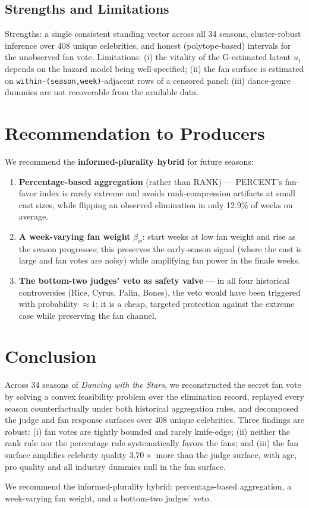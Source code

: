 \documentclass[11pt]{article}
\begin{document}
\subsection{Strengths and Limitations}

Strengths: a single consistent standing vector across all 34 seasons, cluster-robust inference
over 408 unique celebrities, and honest (polytope-based) intervals for the unobserved fan vote.
Limitations: (i) the vitality of the G-estimated latent $u_i$ depends on the hazard model being
well-specified; (ii) the fan surface is estimated on \texttt{within-(season,week)}-adjacent rows
of a censored panel; (iii) dance-genre dummies are not recoverable from the available data.

\section{Recommendation to Producers}
\label{sec:reco}

We recommend the \textbf{informed-plurality hybrid} for future seasons:
\begin{enumerate}
\item \textbf{Percentage-based aggregation} (rather than RANK) --- PERCENT's fan-favor index is
rarely extreme and avoids rank-compression artifacts at small cast sizes, while flipping an
observed elimination in only 12.9\% of weeks on average.
\item \textbf{A week-varying fan weight} $\beta_w$: start weeks at low fan weight and rise as
the season progresses; this preserves the early-season signal (where the cast is large and
fan votes are noisy) while amplifying fan power in the finale weeks.
\item \textbf{The bottom-two judges' veto as safety valve} --- in all four historical
controversies (Rice, Cyrus, Palin, Bones), the veto would have been triggered with probability
$\approx 1$; it is a cheap, targeted protection against the extreme case while preserving the
fan channel.
\end{enumerate}

\section{Conclusion}
\label{sec:conclusion}

Across 34 seasons of \textit{Dancing with the Stars}, we reconstructed the secret fan vote by
solving a convex feasibility problem over the elimination record, replayed every season
counterfactually under both historical aggregation rules, and decomposed the judge and fan
response surfaces over 408 unique celebrities. Three findings are robust: (i) fan votes are
tightly bounded and rarely knife-edge; (ii) neither the rank rule nor the percentage rule
systematically favors the fans; and (iii) the fan surface amplifies celebrity quality
$3.70\times$ more than the judge surface, with age, pro quality and all industry dummies null
in the fan surface.

We recommend the informed-plurality hybrid: percentage-based aggregation,
a week-varying fan weight, and a bottom-two judges' veto.
\end{document}
